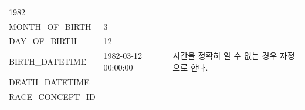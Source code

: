 \documentclass[11pt]{book}
\theoremstyle{definition}
\theoremstyle{definition}
\theoremstyle{definition}
\theoremstyle{remark}
\begin{document}
\begin{longtable}[]{@{}lll@{}}
\begin{minipage}[t]{0.16\columnwidth}
1982\strut
\end{minipage} & \begin{minipage}[t]{0.48\columnwidth}\raggedright\strut
\strut
\end{minipage}\tabularnewline
\begin{minipage}[t]{0.28\columnwidth}\raggedright\strut
MONTH\_OF\_BIRTH\strut
\end{minipage} & \begin{minipage}[t]{0.16\columnwidth}\raggedright\strut
3\strut
\end{minipage} & \begin{minipage}[t]{0.48\columnwidth}\raggedright\strut
\strut
\end{minipage}\tabularnewline
\begin{minipage}[t]{0.28\columnwidth}\raggedright\strut
DAY\_OF\_BIRTH\strut
\end{minipage} & \begin{minipage}[t]{0.16\columnwidth}\raggedright\strut
12\strut
\end{minipage} & \begin{minipage}[t]{0.48\columnwidth}\raggedright\strut
\strut
\end{minipage}\tabularnewline
\begin{minipage}[t]{0.28\columnwidth}\raggedright\strut
BIRTH\_DATETIME\strut
\end{minipage} & \begin{minipage}[t]{0.16\columnwidth}\raggedright\strut
1982-03-12 00:00:00\strut
\end{minipage} & \begin{minipage}[t]{0.48\columnwidth}\raggedright\strut
시간을 정확히 알 수 없는 경우 자정으로 한다.\strut
\end{minipage}\tabularnewline
\begin{minipage}[t]{0.28\columnwidth}\raggedright\strut
DEATH\_DATETIME\strut
\end{minipage} & \begin{minipage}[t]{0.16\columnwidth}\raggedright\strut
\strut
\end{minipage} & \begin{minipage}[t]{0.48\columnwidth}\raggedright\strut
\strut
\end{minipage}\tabularnewline
\begin{minipage}[t]{0.28\columnwidth}\raggedright\strut
RACE\_CONCEPT\_ID\strut
\end{minipage} & \begin{minipage}[t]{0.16\columnwidth}\raggedright\strut

\end{minipage}
\end{longtable}
\end{document}
